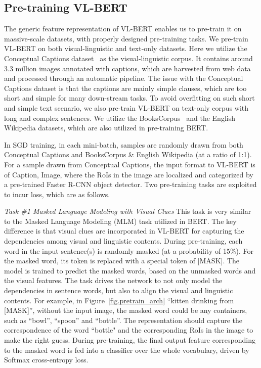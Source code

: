 \documentclass{article} \usepackage{iclr2020_conference,times}
\begin{document}
\subsection{Pre-training VL-BERT}
\label{sec:pre_training_tasks}


The generic feature representation of VL-BERT enables us to pre-train it on massive-scale datasets, with properly designed pre-training tasks. We pre-train VL-BERT on both visual-linguistic and text-only datasets. Here we utilize the Conceptual Captions dataset~\citep{sharma2018conceptual} as the visual-linguistic corpus. It contains around 3.3 million images annotated with captions, which are harvested from web data and processed through an automatic pipeline. The issue with the Conceptual Captions dataset is that the captions are mainly simple clauses, which are too short and simple for many down-stream tasks. To avoid overfitting on such short and simple text scenario, we also pre-train VL-BERT on text-only corpus with long and complex sentences. We utilize the BooksCorpus~\citep{zhu2015aligning} and the English Wikipedia datasets, which are also utilized in pre-training BERT.


In SGD training, in each mini-batch, samples are randomly drawn from both Conceptual Captions and BooksCorpus \& English Wikipedia (at a ratio of 1:1). For a sample drawn from Conceptual Captions, the input format to VL-BERT is of Caption, Image, where the RoIs in the image are localized and categorized by a pre-trained Faster R-CNN object detector. Two pre-training tasks are exploited to incur loss, which are as follows.

\emph{Task \#1 Masked Language Modeling with Visual Clues} This task is very similar to the Masked Language Modeling (MLM) task utilized in BERT. The key difference is that visual clues are incorporated in VL-BERT for capturing the dependencies among visual and linguistic contents. During pre-training, each word in the input sentence(s) is randomly masked (at a probability of 15\%). For the masked word, its token is replaced with a special token of [MASK]. The model is trained to predict the masked words, based on the unmasked words and the visual features. The task drives the network to not only model the dependencies in sentence words, but also to align the visual and linguistic contents. For example, in Figure~\ref{fig.pretrain_arch} ``kitten drinking from [MASK]'', without the input image, the masked word could be any containers, such as ``bowl'', ``spoon'' and ``bottle''. The representation should capture the correspondence of the word ``bottle" and the corresponding RoIs in the image to make the right guess. During pre-training, the final output feature corresponding to the masked word is fed into a classifier over the whole vocabulary, driven by Softmax cross-entropy loss.
\end{document}
